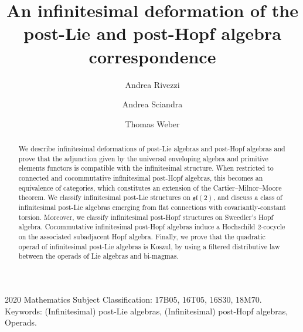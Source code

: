 \documentclass[10pt]{article}
\theoremstyle{definition}
\begin{document}
\setlength{\parindent}{0pt} %
\title {\textbf{An infinitesimal deformation of the post-Lie and post-Hopf algebra correspondence}}

\author[a]{Andrea Rivezzi}
\author[b]{Andrea Sciandra}
\author[a]{Thomas Weber}


  


\date{}
\maketitle
\vspace{-1cm}
\begin{abstract}
\noindent
We describe infinitesimal deformations of post-Lie algebras and post-Hopf algebras and prove that the adjunction given by the universal enveloping algebra and primitive elements functors is compatible with the infinitesimal structure. When restricted to connected and cocommutative infinitesimal post-Hopf algebras, this becomes an equivalence of categories, which constitutes an extension of the Cartier--Milnor--Moore theorem. 
We classify infinitesimal post-Lie structures on $\mathfrak{sl}(2)$, and discuss a class of infinitesimal post-Lie algebras emerging from flat connections with covariantly-constant torsion. Moreover, we classify infinitesimal post-Hopf structures on Sweedler's Hopf algebra. Cocommutative infinitesimal post-Hopf algebras induce a Hochschild 2-cocycle on the associated subadjacent Hopf algebra. Finally, we prove that the quadratic operad of infinitesimal post-Lie algebras is Koszul, by using a filtered distributive law between the operads of Lie algebras and bi-magmas.
\end{abstract}
2020 Mathematics Subject Classification: 17B05, 16T05, 16S30, 18M70. \\ 
Keywords: (Infinitesimal) post-Lie algebras, (Infinitesimal) post-Hopf algebras, Operads.


\tableofcontents
\end{document}
